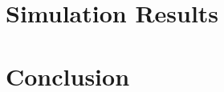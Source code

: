 \documentclass[letterpaper,12pt]{article}
\numberwithin{equation}{section}
\numberwithin{figure}{section}
\numberwithin{table}{section}
\begin{document}
\begin{spacing}{1.5}
\section{Simulation Results} \label{sec_results}



\section{Conclusion} \label{sec_concl}

	

\clearpage



\end{spacing}
\newpage
\nocite{*}

\end{document}
